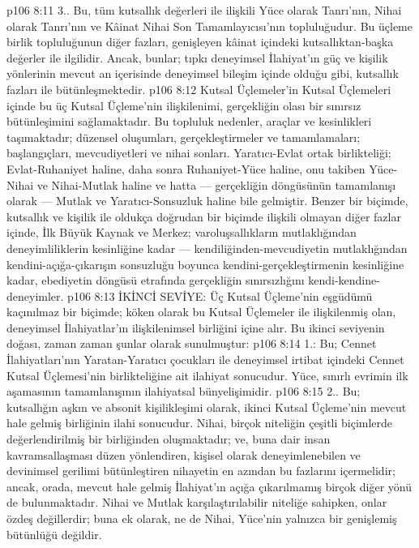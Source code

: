 \vs p106 8:11 3.\bibnobreakspace {}. Bu, tüm kutsallık değerleri ile ilişkili Yüce olarak Tanrı’nın, Nihai olarak Tanrı’nın ve Kâinat Nihai Son Tamamlayıcısı’nın topluluğudur. Bu üçleme birlik topluluğunun diğer fazları, genişleyen kâinat içindeki kutsallıktan\hyp{}başka değerler ile ilgilidir. Ancak, bunlar; tıpkı deneyimsel İlahiyat’ın güç ve kişilik yönlerinin mevcut an içerisinde deneyimsel bileşim içinde olduğu gibi, kutsallık fazları ile bütünleşmektedir.
\vs p106 8:12 Kutsal Üçlemeler’in Kutsal Üçlemeleri içinde bu üç Kutsal Üçleme’nin ilişkilenimi, gerçekliğin olası bir sınırsız bütünleşimini sağlamaktadır. Bu topluluk nedenler, araçlar ve kesinlikleri taşımaktadır; düzensel oluşumları, gerçekleştirmeler ve tamamlamaları; başlangıçları, mevcudiyetleri ve nihai sonları. Yaratıcı\hyp{}Evlat ortak birlikteliği; Evlat\hyp{}Ruhaniyet haline, daha sonra Ruhaniyet\hyp{}Yüce haline, onu takiben Yüce\hyp{}Nihai ve Nihai\hyp{}Mutlak haline ve hatta --- gerçekliğin döngüsünün tamamlanışı olarak --- Mutlak ve Yaratıcı\hyp{}Sonsuzluk haline bile gelmiştir. Benzer bir biçimde, kutsallık ve kişilik ile oldukça doğrudan bir biçimde ilişkili olmayan diğer fazlar içinde, İlk Büyük Kaynak ve Merkez; varoluşsallıkların mutlaklığından deneyimliliklerin kesinliğine kadar --- kendiliğinden\hyp{}mevcudiyetin mutlaklığından kendini\hyp{}açığa\hyp{}çıkarışın sonsuzluğu boyunca kendini\hyp{}gerçekleştirmenin kesinliğine kadar, ebediyetin döngüsü etrafında gerçekliğin sınırsızlığını kendi\hyp{}kendine\hyp{}deneyimler.
\vs p106 8:13 İKİNCİ SEVİYE: Üç Kutsal Üçleme’nin eşgüdümü kaçınılmaz bir biçimde; köken olarak bu Kutsal Üçlemeler ile ilişkilenmiş olan, deneyimsel İlahiyatlar’ın ilişkilenimsel birliğini içine alır. Bu ikinci seviyenin doğası, zaman zaman şunlar olarak sunulmuştur:
\vs p106 8:14 1.\bibnobreakspace {}: Bu; Cennet İlahiyatları’nın Yaratan\hyp{}Yaratıcı çocukları ile deneyimsel irtibat içindeki Cennet Kutsal Üçlemesi’nin birlikteliğine ait ilahiyat sonucudur. Yüce, sınırlı evrimin ilk aşamasının tamamlanışının ilahiyatsal bünyelişimidir.
\vs p106 8:15 2.\bibnobreakspace {}. Bu; kutsallığın aşkın ve absonit kişilikleşimi olarak, ikinci Kutsal Üçleme’nin mevcut hale gelmiş birliğinin ilahi sonucudur. Nihai, birçok niteliğin çeşitli biçimlerde değerlendirilmiş bir birliğinden oluşmaktadır; ve, buna dair insan kavramsallaşması düzen yönlendiren, kişisel olarak deneyimlenebilen ve devinimsel gerilimi bütünleştiren nihayetin en azından bu fazlarını içermelidir; ancak, orada, mevcut hale gelmiş İlahiyat’ın açığa çıkarılmamış birçok diğer yönü de bulunmaktadır. Nihai ve Mutlak karşılaştırılabilir niteliğe sahipken, onlar özdeş değillerdir; buna ek olarak, ne de Nihai, Yüce’nin yalnızca bir genişlemiş bütünlüğü değildir.
